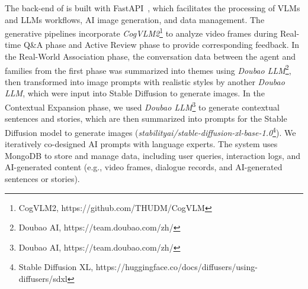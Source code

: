 The back-end of \name{} is built with FastAPI~\cite{fastapi}, which facilitates the processing of VLMs and LLMs workflows, AI image generation, and data management. 
The generative pipelines incorporate \textit{CogVLM2}\footnote{CogVLM2, https://github.com/THUDM/CogVLM} to analyze video frames during Real-time Q\&A phase and Active Review phase to provide corresponding feedback. 
In the Real-World Association phase, the conversation data between the agent and families from the first phase was summarized into themes using \textit{Doubao LLM}\footnote{Doubao AI, https://team.doubao.com/zh/}, then transformed into image prompts with realistic styles by another \textit{Doubao LLM}, which were input into Stable Diffusion to generate images.
In the Contextual Expansion phase, we used \textit{Doubao LLM}\footnote{Doubao AI, https://team.doubao.com/zh/} to generate contextual sentences and stories, which are then summarized into prompts for the Stable Diffusion model to generate images (\textit{stabilityai/stable-diffusion-xl-base-1.0}\footnote{Stable Diffusion XL, https://huggingface.co/docs/diffusers/using-diffusers/sdxl}).
We iteratively co-designed AI prompts with language experts.
The system uses MongoDB to store and manage data, including user queries, interaction logs, and AI-generated content (e.g., video frames, dialogue records, and AI-generated sentences or stories).